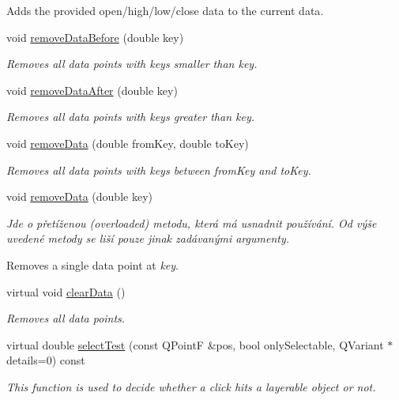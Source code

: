 \begin{DoxyCompactItemize}
\begin{DoxyCompactList}
Adds the provided open/high/low/close data to the current data. \end{DoxyCompactList}\item 
void \hyperlink{classQCPFinancial_a097c0383c7c1e9042ca7f93cb439d15a}{remove\+Data\+Before} (double key)
\begin{DoxyCompactList}\small\item\em Removes all data points with keys smaller than {\itshape key}. \end{DoxyCompactList}\item 
void \hyperlink{classQCPFinancial_aa0fcd357005288c833a230c7874825ba}{remove\+Data\+After} (double key)
\begin{DoxyCompactList}\small\item\em Removes all data points with keys greater than {\itshape key}. \end{DoxyCompactList}\item 
void \hyperlink{classQCPFinancial_a048c741d3c8cc5709c2c44b759fdf27c}{remove\+Data} (double from\+Key, double to\+Key)
\begin{DoxyCompactList}\small\item\em Removes all data points with keys between {\itshape from\+Key} and {\itshape to\+Key}. \end{DoxyCompactList}\item 
void \hyperlink{classQCPFinancial_ae527d8a11290906b083d1ab598c380ea}{remove\+Data} (double key)
\begin{DoxyCompactList}\small\item\em Jde o přetíženou (overloaded) metodu, která má usnadnit používání. Od výše uvedené metody se liší pouze jinak zadávanými argumenty.

Removes a single data point at {\itshape key}. \end{DoxyCompactList}\item 
virtual void \hyperlink{classQCPFinancial_a11fd49928c33e55e27b7319c6927864a}{clear\+Data} ()
\begin{DoxyCompactList}\small\item\em Removes all data points. \end{DoxyCompactList}\item 
virtual double \hyperlink{classQCPFinancial_adf6cff00a55f775487d375fe4df5e95b}{select\+Test} (const Q\+Point\+F \&pos, bool only\+Selectable, Q\+Variant $\ast$details=0) const 
\begin{DoxyCompactList}\small\item\em This function is used to decide whether a click hits a layerable object or not. \end{DoxyCompactList}\end{DoxyCompactItemize}
